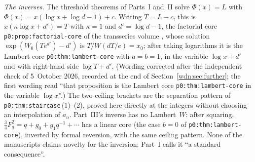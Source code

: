 \documentclass[11pt,letterpaper]{article}
\theoremstyle{remark}\newtheorem{remark}[theorem]{Remark}
\begin{document}
\emph{The inverses.} The threshold theorems of Parts~I and~II solve $\Phi(x)=L$ with $\Phi(x)=x(\log x+\log d-1)+c$. Writing $T=L-c$, this is $x(\kappa\log x+d')=T$ with $\kappa=1$ and $d'=\log d-1$, the factorial core \texttt{p0:prop:factorial-core} of the transseries volume \cite{TSvol}, whose solution $\exp(W_0(Te^{d'})-d')$ is $T/W(dT/e)=x_0$; after taking logarithms it is the Lambert core \texttt{p0:thm:lambert-core} with $a=b=1$, in the variable $\log x+d'$ and with right-hand side $\log T+d'$. \textup{(Wording corrected after the independent check of 5~October 2026, recorded at the end of Section~\ref{wdn:sec:further}; the first wording read ``that proposition is the Lambert core \texttt{p0:thm:lambert-core} in the variable $\log x$''.)} The two-ceiling brackets are the separation pattern of \texttt{p0:thm:staircase}\,(1)--(2), proved here directly at the integers without choosing an interpolation of $a_n$. Part~III's inverse has no Lambert~$W$: after squaring, $\frac34F_q^2=q+g_0+g_1q^{-1}+\cdots$ has a linear core (the case $b=0$ of \texttt{p0:thm:lambert-core}), inverted by formal reversion, with the same ceiling pattern. None of the manuscripts claims novelty for the inversion; Part~I calls it ``a standard consequence''.
\end{document}
